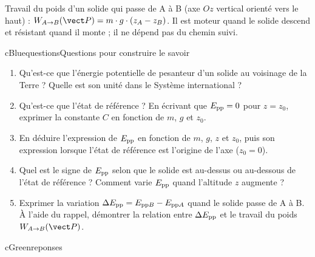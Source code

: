 \begin{rappel}
Travail du poids d’un solide qui passe de A à B (axe $Oz$ vertical orienté vers le haut) : $W_{A\to B}(\vect P) = m\cdot g\cdot(z_A - z_B)$. Il est moteur quand le solide descend et résistant quand il monte ; il ne dépend pas du chemin suivi.
\end{rappel}

\begin{rub}{cBlue}{questions}{Questions pour construire le savoir}
\begin{enumerate}
  \item {} Qu’est-ce que l’énergie potentielle de pesanteur d’un solide au voisinage de la Terre ? Quelle est son unité dans le Système international ?
  \item {} Qu’est-ce que l’état de référence ? En écrivant que $E_{\mathrm{pp}} = 0$ pour $z = z_0$, exprimer la constante $C$ en fonction de $m$, $g$ et $z_0$.
  \item {} En déduire l’expression de $E_{\mathrm{pp}}$ en fonction de $m$, $g$, $z$ et $z_0$, puis son expression lorsque l’état de référence est l’origine de l’axe ($z_0 = 0$).
  \item {} Quel est le signe de $E_{\mathrm{pp}}$ selon que le solide est au-dessus ou au-dessous de l’état de référence ? Comment varie $E_{\mathrm{pp}}$ quand l’altitude $z$ augmente ?
  \item {} Exprimer la variation $\Delta E_{\mathrm{pp}} = E_{\mathrm{pp}B} - E_{\mathrm{pp}A}$ quand le solide passe de A à B. À l’aide du rappel, démontrer la relation entre $\Delta E_{\mathrm{pp}}$ et le travail du poids $\WAB P$.
\end{enumerate}
\end{rub}

\begin{rub}{cGreen}{reponses}{\titrereponses}
\begin{reps}
  \item {}
  \item {}
  \item {}
  \item {}
  \item {}
\end{reps}
\end{rub}

